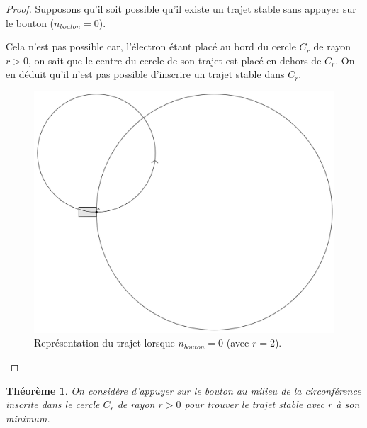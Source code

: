 \documentclass[a4paper]{amsart}
\newtheorem{theorem}{Théorème}[section]
\theoremstyle{definition}
\theoremstyle{remark}
\numberwithin{equation}{section}
\begin{document}
\begin{proof}
  Supposons qu'il soit possible qu'il existe un trajet stable sans appuyer sur le bouton ($n_{bouton}=0$).

  Cela n'est pas possible car, l'électron étant placé au bord du cercle $C_r$ de rayon $r>0$, on sait que le centre du cercle de son trajet est placé en dehors de $C_r$. On en déduit qu'il n'est pas possible
  d'inscrire un trajet stable dans $C_r$.

  \begin{figure}[H]
    \centering
    \includegraphics[scale=0.15]{images/not_possible.png}
    \caption{Représentation du trajet lorsque $n_{bouton}=0$ (avec $r=2$).}
  \end{figure}
\end{proof}

\begin{theorem}
  On considère d'appuyer sur le bouton au milieu de la circonférence inscrite dans le cercle $C_r$ de rayon $r>0$ pour trouver le trajet stable avec $r$ à son minimum.
\end{theorem}
\end{document}
